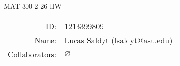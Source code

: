 \documentclass[notitlepage]{homework}
\author{Lucas Saldyt}
\title{\AssignmentName}
\newcommand{\AssignmentName}{MAT 300 2-26 HW}
\begin{document}

\begin{titlepage}
	\begin{center}
		{\Large \AssignmentName}
		
		\bigskip

		\begin{tabular}{rl}
			ID: & 1213399809 \\ %
            Name: & Lucas Saldyt (lsaldyt@asu.edu) \\ %
			Collaborators: & $\varnothing$
		\end{tabular}

		\bigskip

	\end{center}

	\toccontents

	\vfill

\end{titlepage}

  
  
  

\end{document}
